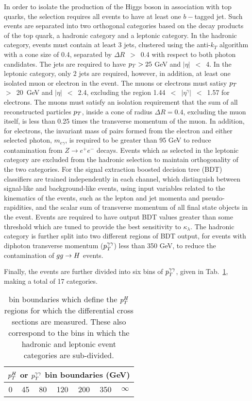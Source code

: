 In order to isolate the production of the Higgs boson in association with top quarks, the selection requires all events to have at least one $b-$tagged jet. Such events are separated into two orthogonal categories based on the decay products of the top quark, a hadronic category and a leptonic category. In the hadronic category, events must contain at least 3 jets, clustered using the anti-$k_{T}$ algorithm with a cone size of 0.4, separated by $\Delta R$~$>$~0.4 with respect to both photon candidates. The jets are required to have $p_{T}>25$ GeV and $|\eta|$~$<$~4. In the leptonic category, only 2 jets are required, however, in addition, at least one isolated muon or electron in the event. The muons or electrons must satisy $p_{T}$~$>$~20~GeV and $|\eta|$~$<$~2.4, excluding the region 1.44~$<$~$|\eta^\gamma|$~$<$~1.57 for electrons. The muons must satisfy an isolation requirement that the sum of all reconstructed particles $p_{T}$, inside a cone of radius $\Delta R=0.4$, excluding the muon itself, is less than 0.25 times the transverse momentum of the muon. In addition, for electrons, the invariant mass of pairs formed from the electron and either selected photon, $m_{e\gamma}$, is required to be greater than 95 GeV to reduce contamination from $Z\rightarrow e^{+}e^{-}$ decays. Events which as selected in the leptonic category are excluded from the hadronic selection to maintain orthogonality of the two categories.  
For the signal extraction boosted decision tree (BDT) classifiers are trained independently in each channel, which distinguish between signal-like and background-like events, using input variables related to the kinematics of the events, such as the lepton and jet momenta and pseudo-rapidities, and the scalar sum of transverse momentum of all final state objects in the event. Events are required to have output BDT values greater than some threshold which are tuned to provide the best sensitivity to $\kappa_{\lambda}$. The hadronic category is further split into two different regions of BDT output, for events with diphoton transverse momentum ($p_{T}^{\gamma\gamma}$) less than 350 GeV, to reduce the contamination of $gg\rightarrow H$ events. 

Finally, the events are further divided into six bins of $p_{T}^{\gamma\gamma}$, given in Tab.~\ref{tab:ttHdiff_CMS_ptbins}, making a total of 17 categories. 

\begin{table}[h]

 \centering
 \begin{tabular}{c|c|c|c|c|c|c}
    \multicolumn{7}{c}{$p_{T}^{H}$ or $p_{T}^{\gamma\gamma}$ bin boundaries (GeV)}  \\ \hline
    0 & 45 & 80 & 120 & 200 & 350 & $\infty$ \\\hline
\end{tabular}
\caption{bin boundaries which define the $p_{T}^{H}$ regions for which the differential cross sections are measured. These also correspond to the bins in which the hadronic and leptonic event categories are sub-divided.}
\label{tab:ttHdiff_CMS_ptbins}
\end{table}

